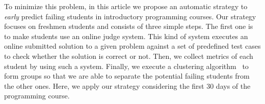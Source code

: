 




To minimize this problem, in this article we propose an automatic strategy to \textit{early} predict failing students in introductory programming courses. Our strategy focuses on freshmen students and consists of three simple steps. The first one is to make students use an online judge system. This kind of system executes an online submitted solution to a given problem against a set of predefined test cases to check whether the solution is correct or not. Then, we collect metrics of each student by using such a system. Finally, we execute a clustering algorithm~\cite{hartigan-clustering-algorithms-1975} to form groups so that we are able to separate the potential failing students from the other ones. Here, we apply our strategy considering the first 30 days of the programming course.

